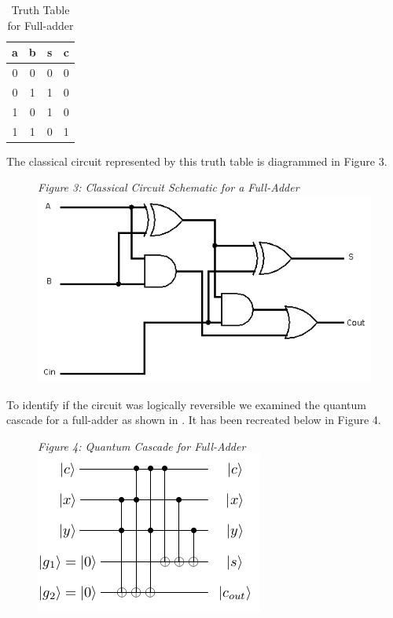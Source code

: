 \documentclass{IEEEtran}
\begin{document}
\begin{table}[h!]
\caption{Truth Table for Full-adder}
\begin{center}
\begin{tabular}{| c  c | c  c |}
    \hline
    a&b&s&c \\
    \hline
    \hline
    0&0&0&0 \\
    0&1&1&0 \\
    1&0&1&0 \\
    1&1&0&1 \\ 
    \hline
\end{tabular}
\end{center}

\end{table}

The classical circuit represented by this truth table is diagrammed in Figure 3.

\begin{figure}[h!]
\begin{center}
\textit{\small{\label{fig:cfa}Figure 3: Classical Circuit Schematic for a Full-Adder}}
  \includegraphics[scale=0.4]{figures/fulladder.png}
\end{center}
\end{figure}

To identify if the circuit was logically reversible we examined the quantum cascade for a full-adder as shown in \cite{qcagi}. It has been recreated below in Figure 4.

\begin{figure}[H]
\begin{center}
\textit{\small{\label{fig:qfa}Figure 4: Quantum Cascade for Full-Adder}} 
  \includegraphics[scale=0.6]{figures/Full_adder_qc.png}
\end{center}
\end{figure}
\end{document}
